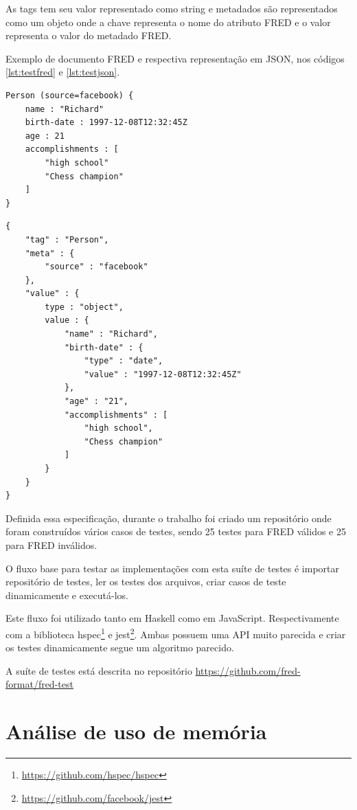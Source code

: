As tags tem seu valor representado como string e metadados são representados 
como um objeto onde a chave representa o nome do atributo FRED e o valor 
representa o valor do metadado FRED.

Exemplo de documento FRED e respectiva representação em JSON, nos códigos \ref{lst:testfred}
e \ref{lst:testjson}.

\begin{lstlisting}[float,floatplacement=H,caption=Exemplo de FRED ,label={lst:testfred}]
Person (source=facebook) {
    name : "Richard"
    birth-date : 1997-12-08T12:32:45Z
    age : 21
    accomplishments : [
        "high school"
        "Chess champion"
    ]
}
\end{lstlisting}


\begin{lstlisting}[caption=Exemplo de JSON no formato de testes ,label={lst:testjson}]
{
    "tag" : "Person",
    "meta" : {
        "source" : "facebook"
    },
    "value" : {
        type : "object",
        value : {
            "name" : "Richard",
            "birth-date" : {
                "type" : "date",
                "value" : "1997-12-08T12:32:45Z"
            },
            "age" : "21", 
            "accomplishments" : [
                "high school",
                "Chess champion"
            ]
        }
    }
}
\end{lstlisting}
    
Definida essa especificação, durante o trabalho foi criado um repositório onde
foram construídos vários casos de testes, sendo 25 testes para FRED válidos
e 25 para FRED inválidos.

O fluxo base para testar as implementações com esta suíte de testes é 
importar repositório de testes, ler os testes dos arquivos, criar 
casos de teste dinamicamente e executá-los.

Este fluxo foi utilizado tanto em Haskell como em JavaScript. Respectivamente
com a biblioteca hspec\footnote{\url{https://github.com/hspec/hspec}} e 
jest\footnote{\url{https://github.com/facebook/jest}}.
Ambas possuem uma API muito parecida e criar os testes dinamicamente segue 
um algoritmo parecido.

A suíte de testes está descrita no 
repositório \url{https://github.com/fred-format/fred-test}

\section{Análise de uso de memória}

